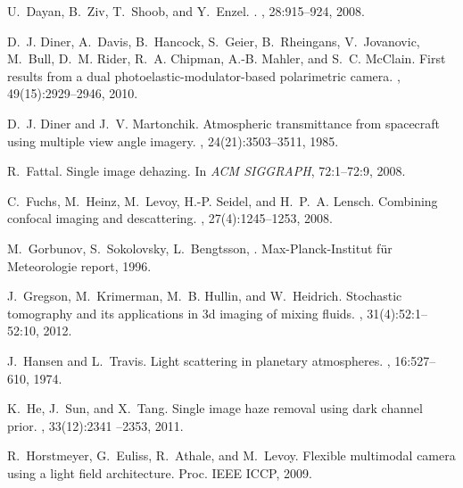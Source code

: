 \documentclass[10pt,twocolumn,letterpaper]{article}
\begin{document}
{\begin{thebibliography}{10}
U.~{Dayan}, B.~{Ziv}, T.~{Shoob}, and Y.~{Enzel}.
.
, 28:915--924, 2008.

D.~J. Diner, A.~Davis, B.~Hancock, S.~Geier, B.~Rheingans, V.~Jovanovic,
  M.~Bull, D.~M. Rider, R.~A. Chipman, A.-B. Mahler, and S.~C. McClain.
\newblock First results from a dual photoelastic-modulator-based polarimetric
  camera.
, 49(15):2929--2946, 2010.


D.~J. Diner and J.~V. Martonchik.
\newblock Atmospheric transmittance from spacecraft using multiple view angle
  imagery.
, 24(21):3503--3511, 1985.

R.~Fattal.
\newblock Single image dehazing.
\newblock In {\em ACM SIGGRAPH}, 72:1--72:9, 2008.

C.~Fuchs, M.~Heinz, M.~Levoy, H.-P. Seidel, and H.~P.~A. Lensch.
\newblock Combining confocal imaging and descattering.
, 27(4):1245--1253, 2008.

M.~Gorbunov, S.~Sokolovsky, L.~Bengtsson, %
.
\newblock Max-Planck-Institut f{\"u}r Meteorologie report, 1996.

J.~Gregson, M.~Krimerman, M.~B. Hullin, and W.~Heidrich.
\newblock Stochastic tomography and its applications in 3d imaging of mixing
  fluids.
, 31(4):52:1--52:10, 2012.

J.~Hansen and L.~Travis.
\newblock Light scattering in planetary atmospheres.
, 16:527--610, 1974.

K.~He, J.~Sun, and X.~Tang.
\newblock Single image haze removal using dark channel prior.
, 33(12):2341 --2353, 2011.

R.~Horstmeyer, G.~Euliss, R.~Athale, and M.~Levoy.
\newblock Flexible multimodal camera using a light field architecture.
\newblock Proc. IEEE ICCP, 2009.


\end{thebibliography}}
\end{document}

